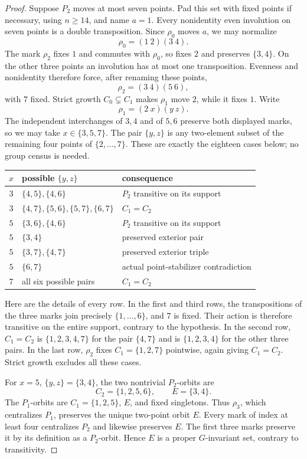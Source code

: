 \documentclass[11pt,a4paper]{article}
\begin{document}
\begin{proof}
Suppose $P_2$ moves at most seven points. Pad this set with
fixed points if necessary, using $n\ge14$, and name $a=1$.
Every nonidentity even involution on seven points is a double
transposition. Since $\rho_0$ moves $a$, we may normalize
\[
                    \rho_0=(1\ 2)(3\ 4).
\]
The mark $\rho_2$ fixes $1$ and commutes with $\rho_0$,
so fixes $2$ and preserves $\{3,4\}$. On the other three
points an involution has at most one transposition. Evenness
and nonidentity therefore force, after renaming these points,
\[
                    \rho_2=(3\ 4)(5\ 6),
\]
with $7$ fixed. Strict growth $C_0\subsetneq C_1$ makes
$\rho_1$ move $2$, while it fixes $1$. Write
\[
                    \rho_1=(2\ x)(y\ z).
\]
The independent interchanges of $3,4$ and of $5,6$ preserve
both displayed marks, so we may take $x\in\{3,5,7\}$.
The pair $\{y,z\}$ is any two-element subset of the remaining
four points of $\{2,\ldots,7\}$. These are exactly the
eighteen cases below; no group census is needed.

\begin{center}
\begin{tabular}{c|l|l}
$x$ & possible $\{y,z\}$ & consequence\\\hline
$3$ & $\{4,5\},\{4,6\}$ & $P_2$ transitive on its support\\
$3$ & $\{4,7\},\{5,6\},\{5,7\},\{6,7\}$ & $C_1=C_2$\\
$5$ & $\{3,6\},\{4,6\}$ & $P_2$ transitive on its support\\
$5$ & $\{3,4\}$ & preserved exterior pair\\
$5$ & $\{3,7\},\{4,7\}$ & preserved exterior triple\\
$5$ & $\{6,7\}$ & actual point-stabilizer contradiction\\
$7$ & all six possible pairs & $C_1=C_2$
\end{tabular}
\end{center}
Here are the details of every row. In the first and third rows,
the transpositions of the three marks join precisely
$\{1,\ldots,6\}$, and $7$ is fixed. Their action is therefore
transitive on the entire support, contrary to the hypothesis.
In the second row, $C_1=C_2$ is $\{1,2,3,4,7\}$ for the
pair $\{4,7\}$ and is $\{1,2,3,4\}$ for the other three
pairs. In the last row, $\rho_2$ fixes $C_1=\{1,2,7\}$
pointwise, again giving $C_1=C_2$. Strict growth excludes
all these cases.

For $x=5$, $\{y,z\}=\{3,4\}$, the two nontrivial
$P_2$-orbits are
\[
                  C_2=\{1,2,5,6\},\qquad E=\{3,4\}.
\]
The $P_1$-orbits are $C_1=\{1,2,5\}$, $E$, and fixed
singletons. Thus $\rho_3$, which centralizes $P_1$, preserves
the unique two-point orbit $E$. Every mark of index at least
four centralizes $P_2$ and likewise preserves $E$.
The first three marks preserve it by its definition as a
$P_2$-orbit. Hence $E$ is a proper $G$-invariant set,
contrary to transitivity.


\end{proof}
\end{document}
